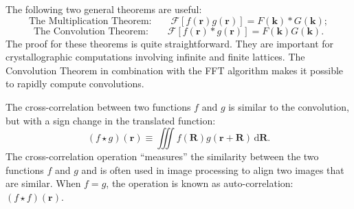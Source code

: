 The following two general theorems are useful:
\begin{equation}
	\mbox{The Multiplication Theorem:} 
	\qquad\mathcal{F}[f(\mathbf{r})g(\mathbf{r})]=F(\mathbf{k})\ast G(\mathbf{k});
	\label{\chabbr:eq:FTmulttheorem}
\end{equation}
\begin{equation}
	\mbox{The Convolution Theorem:} 
	\qquad\mathcal{F}[f(\mathbf{r})\ast g(\mathbf{r})]=F(\mathbf{k})G(\mathbf{k}).
	\label{\chabbr:eq:FTconvtheorem}
\end{equation}
The proof for these theorems is quite straightforward. They are important for crystallographic computations involving infinite and finite lattices.  The Convolution Theorem in combination with the FFT algorithm makes it possible to rapidly compute convolutions.

The cross-correlation between two functions $f$ and $g$ is similar to the convolution, but with a sign change in the translated function:
\begin{equation}
	(f\star g)(\mathbf{r})\equiv \iiint f(\mathbf{R})g(\mathbf{r}+\mathbf{R})\,\mathrm{d}\mathbf{R}.\label{\chabbr:eq:convoldef2}
\end{equation}
The cross-correlation operation ``measures'' the similarity between the two functions $f$ and $g$ and is often used in image processing to align two images that are similar.  When $f=g$, the operation is known as auto-correlation: $(f\star f)(\mathbf{r})$. 

